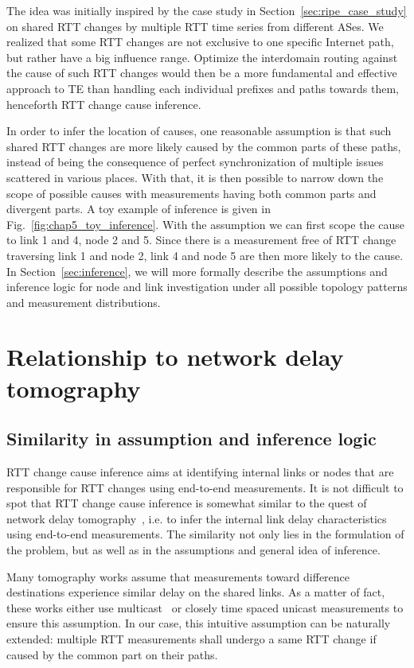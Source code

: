 The idea was initially inspired by the case study in Section~\ref{sec:ripe_case_study} on shared RTT changes by multiple RTT time series from different ASes. 
We realized that some RTT changes are not exclusive to one specific Internet path, but rather have a big influence range.
Optimize the interdomain routing against the cause of such RTT changes would then be a more fundamental and effective approach to TE than handling each individual prefixes and paths towards them, henceforth RTT change cause inference.

In order to infer the location of causes, one reasonable assumption is that such shared RTT changes are more likely caused by the common parts of these paths, instead of being the consequence of perfect synchronization of multiple issues scattered in various places.
With that, it is then possible to narrow down the scope of possible causes with measurements having both common parts and divergent parts. A toy example of inference is given in Fig.~\ref{fig:chap5_toy_inference}. With the assumption we can first scope the cause to link 1 and 4, node 2 and 5. Since there is a measurement free of RTT change traversing link 1 and node 2, link 4 and node 5 are then more likely to the cause. In Section~\ref{sec:inference}, we will more formally describe the assumptions and inference logic for node and link investigation under all possible topology patterns and measurement distributions.

\section{Relationship to network delay tomography}

\subsection{Similarity in assumption and inference logic}
RTT change cause inference aims at identifying internal links or nodes that are responsible for RTT changes using end-to-end measurements.
It is not difficult to spot that RTT change cause inference is somewhat similar to the quest of network delay tomography~\cite{Coates2002}, i.e. to infer the internal link delay characteristics using end-to-end measurements. The similarity not only lies in the formulation of the problem, but as well as in the assumptions and general idea of inference.

Many tomography works assume that measurements toward difference destinations experience similar delay on the shared links. As a matter of fact, these works either use multicast~\cite{LoPresti2002} or closely time spaced unicast measurements\cite{Shih2003,Tsang2003} to ensure this assumption. In our case, this intuitive assumption can be naturally extended: multiple RTT measurements shall undergo a same RTT change if caused by the common part on their paths.


